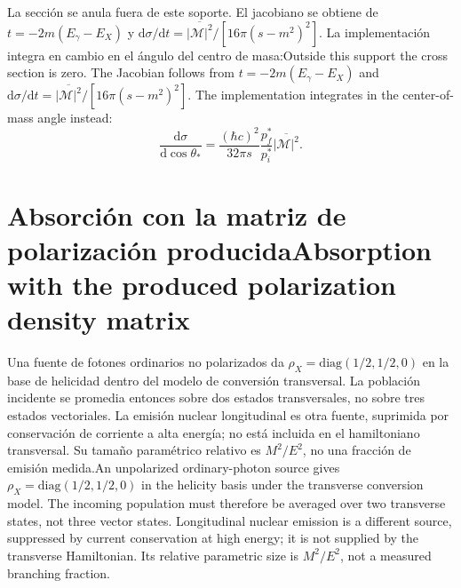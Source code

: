 \documentclass[11pt]{article}
\newcommand{\B}[2]{\ifspanish#2\else#1\fi}
\newcommand{\dd}{\mathrm d}\newcommand{\slsh}[1]{\not\!#1}
\begin{document}
\B{Outside this support the cross section is zero. The Jacobian follows from $t=-2m(E_\gamma-E_X)$ and $\dd\sigma/\dd t=\overline{|\mathcal M|^2}/[16\pi(s-m^2)^2]$. The implementation integrates in the center-of-mass angle instead:}
{La sección se anula fuera de este soporte. El jacobiano se obtiene de $t=-2m(E_\gamma-E_X)$ y $\dd\sigma/\dd t=\overline{|\mathcal M|^2}/[16\pi(s-m^2)^2]$. La implementación integra en cambio en el ángulo del centro de masa:}
\begin{equation}
\frac{\dd\sigma}{\dd\cos\theta_*}=\frac{(\hbar c)^2}{32\pi s}\frac{p_f^*}{p_i^*}\overline{|\mathcal M|^2}.
\end{equation}

\section{\B{Absorption with the produced polarization density matrix}{Absorción con la matriz de polarización producida}}
\B{An unpolarized ordinary-photon source gives $\rho_X=\mathrm{diag}(1/2,1/2,0)$ in the helicity basis under the transverse conversion model. The incoming population must therefore be averaged over two transverse states, not three vector states. Longitudinal nuclear emission is a different source, suppressed by current conservation at high energy; it is not supplied by the transverse Hamiltonian. Its relative parametric size is $M^2/E^2$, not a measured branching fraction.}
{Una fuente de fotones ordinarios no polarizados da $\rho_X=\mathrm{diag}(1/2,1/2,0)$ en la base de helicidad dentro del modelo de conversión transversal. La población incidente se promedia entonces sobre dos estados transversales, no sobre tres estados vectoriales. La emisión nuclear longitudinal es otra fuente, suprimida por conservación de corriente a alta energía; no está incluida en el hamiltoniano transversal. Su tamaño paramétrico relativo es $M^2/E^2$, no una fracción de emisión medida.}
\end{document}
